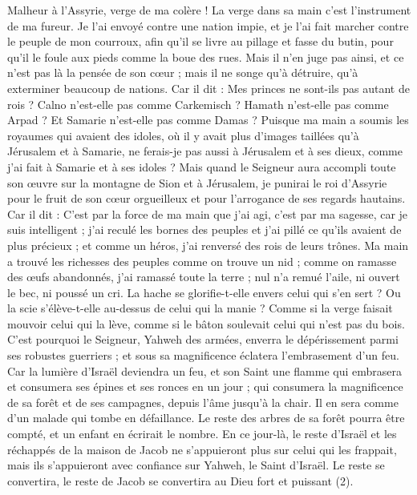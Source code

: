 \begin{multicols}{2}
Malheur à l’Assyrie, verge de ma colère ! La verge dans sa main c’est l’instrument de ma fureur.
Je l’ai envoyé contre une nation impie, et je l’ai fait marcher contre le peuple de mon courroux, afin qu'il se livre au pillage et fasse du butin, pour qu’il le foule aux pieds comme la boue des rues.
Mais il n’en juge pas ainsi, et ce n’est pas là la pensée de son cœur ; mais il ne songe qu’à détruire, qu’à exterminer beaucoup de nations.
Car il dit : Mes princes ne sont-ils pas autant de rois ?
Calno n'est-elle pas comme Carkemisch ? Hamath n'est-elle pas comme Arpad ? Et Samarie n'est-elle pas comme Damas ?
Puisque ma main a soumis les royaumes qui avaient des idoles, où il y avait plus d’images taillées qu’à Jérusalem et à Samarie,
ne ferais-je pas aussi à Jérusalem et à ses dieux, comme j'ai fait à Samarie et à ses idoles ?
Mais quand le Seigneur aura accompli toute son œuvre sur la montagne de Sion et à Jérusalem, je punirai le roi d'Assyrie pour le fruit de son cœur orgueilleux et pour l’arrogance de ses regards hautains.
Car il dit : C’est par la force de ma main que j’ai agi, c’est par ma sagesse, car je suis intelligent ; j'ai reculé les bornes des peuples et j'ai pillé ce qu'ils avaient de plus précieux ; et comme un héros, j'ai renversé des rois de leurs trônes.
Ma main a trouvé les richesses des peuples comme on trouve un nid ; comme on ramasse des œufs abandonnés, j’ai ramassé toute la terre ; nul n’a remué l’aile, ni ouvert le bec, ni poussé un cri.
La hache se glorifie-t-elle envers celui qui s’en sert ? Ou la scie s’élève-t-elle au-dessus de celui qui la manie ? Comme si la verge faisait mouvoir celui qui la lève, comme si le bâton soulevait celui qui n’est pas du bois.
C'est pourquoi le Seigneur, Yahweh des armées, enverra le dépérissement parmi ses robustes guerriers ; et sous sa magnificence éclatera l’embrasement d’un feu.
Car la lumière d'Israël deviendra un feu, et son Saint une flamme qui embrasera et consumera ses épines et ses ronces en un jour ;
qui consumera la magnificence de sa forêt et de ses campagnes, depuis l'âme jusqu'à la chair. Il en sera comme d’un malade qui tombe en défaillance.
Le reste des arbres de sa forêt pourra être compté, et un enfant en écrirait le nombre.
En ce jour-là, le reste d'Israël et les réchappés de la maison de Jacob ne s'appuieront plus sur celui qui les frappait, mais ils s'appuieront avec confiance sur Yahweh, le Saint d'Israël.
Le reste se convertira, le reste de Jacob se convertira au Dieu fort et puissant (2).

\end{multicols}
